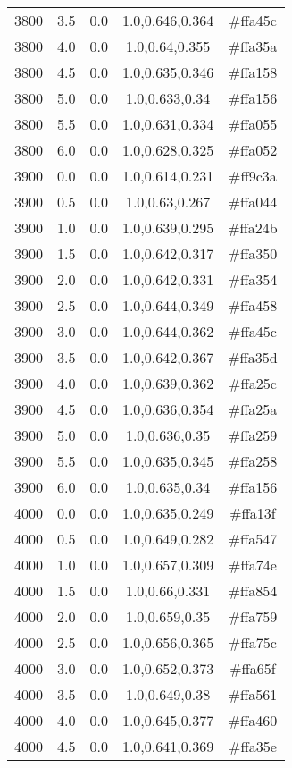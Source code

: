 \begin{tabular}{ccccc}
3800 & 3.5 & 0.0 & 1.0,0.646,0.364 & \#ffa45c \\ 
3800 & 4.0 & 0.0 & 1.0,0.64,0.355 & \#ffa35a \\ 
3800 & 4.5 & 0.0 & 1.0,0.635,0.346 & \#ffa158 \\ 
3800 & 5.0 & 0.0 & 1.0,0.633,0.34 & \#ffa156 \\ 
3800 & 5.5 & 0.0 & 1.0,0.631,0.334 & \#ffa055 \\ 
3800 & 6.0 & 0.0 & 1.0,0.628,0.325 & \#ffa052 \\ 
3900 & 0.0 & 0.0 & 1.0,0.614,0.231 & \#ff9c3a \\ 
3900 & 0.5 & 0.0 & 1.0,0.63,0.267 & \#ffa044 \\ 
3900 & 1.0 & 0.0 & 1.0,0.639,0.295 & \#ffa24b \\ 
3900 & 1.5 & 0.0 & 1.0,0.642,0.317 & \#ffa350 \\ 
3900 & 2.0 & 0.0 & 1.0,0.642,0.331 & \#ffa354 \\ 
3900 & 2.5 & 0.0 & 1.0,0.644,0.349 & \#ffa458 \\ 
3900 & 3.0 & 0.0 & 1.0,0.644,0.362 & \#ffa45c \\ 
3900 & 3.5 & 0.0 & 1.0,0.642,0.367 & \#ffa35d \\ 
3900 & 4.0 & 0.0 & 1.0,0.639,0.362 & \#ffa25c \\ 
3900 & 4.5 & 0.0 & 1.0,0.636,0.354 & \#ffa25a \\ 
3900 & 5.0 & 0.0 & 1.0,0.636,0.35 & \#ffa259 \\ 
3900 & 5.5 & 0.0 & 1.0,0.635,0.345 & \#ffa258 \\ 
3900 & 6.0 & 0.0 & 1.0,0.635,0.34 & \#ffa156 \\ 
4000 & 0.0 & 0.0 & 1.0,0.635,0.249 & \#ffa13f \\ 
4000 & 0.5 & 0.0 & 1.0,0.649,0.282 & \#ffa547 \\ 
4000 & 1.0 & 0.0 & 1.0,0.657,0.309 & \#ffa74e \\ 
4000 & 1.5 & 0.0 & 1.0,0.66,0.331 & \#ffa854 \\ 
4000 & 2.0 & 0.0 & 1.0,0.659,0.35 & \#ffa759 \\ 
4000 & 2.5 & 0.0 & 1.0,0.656,0.365 & \#ffa75c \\ 
4000 & 3.0 & 0.0 & 1.0,0.652,0.373 & \#ffa65f \\ 
4000 & 3.5 & 0.0 & 1.0,0.649,0.38 & \#ffa561 \\ 
4000 & 4.0 & 0.0 & 1.0,0.645,0.377 & \#ffa460 \\ 
4000 & 4.5 & 0.0 & 1.0,0.641,0.369 & \#ffa35e \\ 

\end{tabular}
